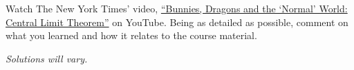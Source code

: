 \documentclass[11pt,letterpaper]{article}
\begin{document}
\newpage



 Watch The New York Times' video, \href{https://www.youtube.com/watch?v=jvoxEYmQHNM&t=1s&pp=ygUfbnl0IGJ1bm5pZXMgYW5kIHdyYW9uZ3MgY2VudHJhbA\%3D\%3D}{``Bunnies, Dragons and the `Normal' World: Central Limit Theorem''} on YouTube. Being as detailed as possible, comment on what you learned and how it relates to the course material. \pspace

\sol \vfill

\begin{center} {\itshape Solutions will vary.} \end{center} \vfill
\end{document}

